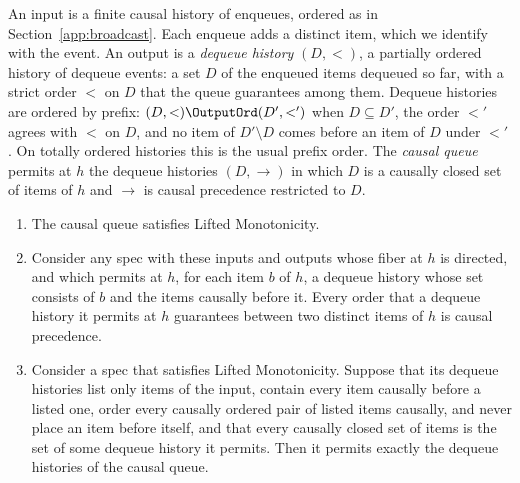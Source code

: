 An input is a finite causal history of enqueues, ordered as in
Section~\ref{app:broadcast}.  Each enqueue adds a distinct item, which we
identify with the event.  An output is a \emph{dequeue history} $(D,<)$, a
partially ordered history of dequeue events: a set $D$ of the enqueued items
dequeued so far, with a strict order $<$ on $D$ that the queue guarantees
among them.  Dequeue histories are ordered by prefix:
$(D,<)\OutputOrd(D',<')$ when $D\subseteq D'$, the order $<'$ agrees with $<$
on $D$, and no item of $D'\setminus D$ comes before an item of $D$ under
$<'$.  On totally ordered histories this is the usual prefix order.  The
\emph{causal queue} permits at $h$ the dequeue histories $(D,\to)$ in which $D$
is a causally closed set of items of $h$ and $\to$ is causal precedence
restricted to $D$.

\begin{proposition}
\label{prop:causal-queue}
\leavevmode
\begin{enumerate}
  \item The causal queue satisfies Lifted Monotonicity.
  \item Consider any spec with these inputs and outputs whose fiber at $h$ is
        directed, and which permits at $h$, for each item $b$ of $h$, a
        dequeue history whose set consists of $b$ and the items causally
        before it.  Every order that a dequeue history it permits at $h$
        guarantees between two distinct items of $h$ is causal precedence.
  \item Consider a spec that satisfies Lifted Monotonicity.  Suppose that its
        dequeue histories list only items of the input, contain every item
        causally before a listed one, order every causally ordered pair of
        listed items causally, and never place an item before itself, and that
        every causally closed set of items is the set of some dequeue history
        it permits.  Then it permits exactly the dequeue histories of the
        causal queue.
\end{enumerate}
\end{proposition}

